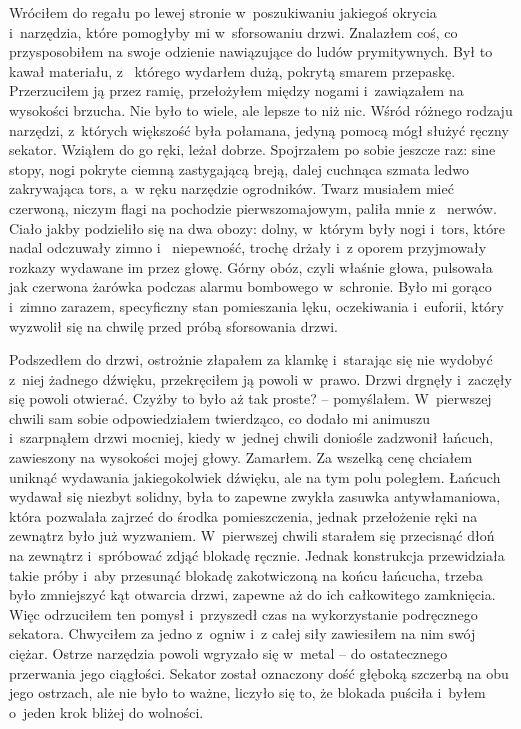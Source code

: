 Wróciłem do regału po lewej stronie w~poszukiwaniu jakiegoś okrycia i~narzędzia, które pomogłyby mi w~sforsowaniu 
drzwi. Znalazłem coś, co przysposobiłem na swoje odzienie nawiązujące do ludów prymitywnych. Był to kawał materiału, z
~którego wydarłem dużą, pokrytą smarem przepaskę. Przerzuciłem ją przez ramię, przełożyłem między nogami i~zawiązałem 
na wysokości brzucha. Nie było to wiele, ale lepsze to niż nic. Wśród różnego rodzaju narzędzi, z~których większość 
była połamana, jedyną pomocą mógł służyć ręczny sekator. Wziąłem do go ręki, leżał dobrze. Spojrzałem po sobie 
jeszcze raz: sine stopy, nogi pokryte ciemną zastygającą breją, dalej cuchnąca szmata ledwo zakrywająca tors, a~w 
ręku narzędzie ogrodników. Twarz musiałem mieć czerwoną, niczym flagi na pochodzie pierwszomajowym, paliła mnie z~
nerwów. Ciało jakby podzieliło się na dwa obozy: dolny, w~którym były nogi i~tors, które nadal odczuwały zimno i~
niepewność, trochę drżały i~z oporem przyjmowały rozkazy wydawane im przez głowę. Górny obóz, czyli właśnie głowa, 
pulsowała jak czerwona żarówka podczas alarmu bombowego w~schronie. Było mi gorąco i~zimno zarazem, specyficzny stan 
pomieszania lęku, oczekiwania i~euforii, który wyzwolił się na chwilę przed próbą sforsowania drzwi.

Podszedłem do drzwi, ostrożnie złapałem za klamkę i~starając się nie wydobyć z~niej żadnego dźwięku, przekręciłem ją 
powoli w~prawo. Drzwi drgnęły i~zaczęły się powoli otwierać. Czyżby to było aż tak proste? -- pomyślałem. W~pierwszej 
chwili sam sobie odpowiedziałem twierdząco, co dodało mi animuszu i~szarpnąłem drzwi mocniej, kiedy w~jednej chwili 
doniośle zadzwonił łańcuch, zawieszony na wysokości mojej głowy. Zamarłem. Za wszelką cenę chciałem uniknąć wydawania 
jakiegokolwiek dźwięku, ale na tym polu poległem. Łańcuch wydawał się niezbyt solidny, była to zapewne zwykła zasuwka 
antywłamaniowa, która pozwalała zajrzeć do środka pomieszczenia, jednak przełożenie ręki na zewnątrz było już 
wyzwaniem. W~pierwszej chwili starałem się przecisnąć dłoń na zewnątrz i~spróbować zdjąć blokadę ręcznie. Jednak 
konstrukcja przewidziała takie próby i~aby przesunąć blokadę zakotwiczoną na końcu łańcucha, trzeba było zmniejszyć 
kąt otwarcia drzwi, zapewne aż do ich całkowitego zamknięcia. Więc odrzuciłem ten pomysł i~przyszedł czas na 
wykorzystanie podręcznego sekatora. Chwyciłem za jedno z~ogniw i~z całej siły zawiesiłem na nim swój ciężar. Ostrze 
narzędzia powoli wgryzało się w~metal -- do ostatecznego przerwania jego ciągłości. Sekator został oznaczony dość 
głęboką szczerbą na obu jego ostrzach, ale nie było to ważne, liczyło się to, że blokada puściła i~byłem o~jeden krok 
bliżej do wolności.

